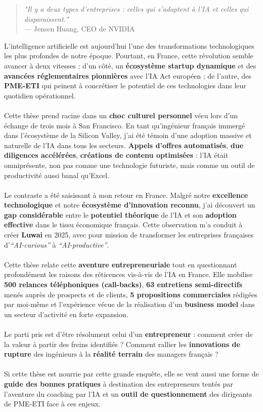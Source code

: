 \begin{quote}
\textit{"Il y a deux types d'entreprises : celles qui s'adaptent à l'IA et celles qui disparaissent."} \\
--- Jensen Huang, CEO de NVIDIA
\end{quote}
\medskip

L’intelligence artificielle est aujourd’hui l’une des transformations technologiques les plus profondes de notre époque. Pourtant, en France, cette révolution semble avancer à deux vitesses : d’un côté, un \textbf{écosystème startup dynamique} et des \textbf{avancées réglementaires pionnières} avec l’IA Act européen ; de l’autre, des \textbf{PME-ETI} qui peinent à concrétiser le potentiel de ces technologies dans leur quotidien opérationnel.
\\\\
Cette thèse prend racine dans un \textbf{choc culturel personnel} vécu lors d’un échange de trois mois à San Francisco. En tant qu’ingénieur français immergé dans l’écosystème de la Silicon Valley, j’ai été témoin d’une adoption massive et naturelle de l’IA dans tous les secteurs. \textbf{Appels d’offres automatisés}, \textbf{due diligences accélérées}, \textbf{créations de contenu optimisées} : l’IA était omniprésente, non pas comme une technologie futuriste, mais comme un outil de productivité aussi banal qu’Excel.
\\\\
Le contraste a été saisissant à mon retour en France. Malgré notre \textbf{excellence technologique} et notre \textbf{écosystème d’innovation reconnu}, j’ai découvert un \textbf{gap considérable} entre le \textbf{potentiel théorique} de l’IA et son \textbf{adoption effective} dans le tissu économique français. Cette observation m’a conduit à créer \textbf{Luwai} en 2025, avec pour mission de transformer les entreprises françaises d’\textit{“AI-curious”} à \textit{“AI-productive”}.
\\\\
Cette thèse relate cette \textbf{aventure entrepreneuriale} tout en questionnant profondément les raisons des réticences vis-à-vis de l’IA en France. Elle mobilise \textbf{500 relances téléphoniques (call-backs)}, \textbf{63 entretiens semi-directifs} menés auprès de prospects et de clients, \textbf{5 propositions commerciales} rédigées par moi-même et l’expérience vécue de la réalisation d’un \textbf{business model} dans un secteur d’activité en forte expansion.
\\\\
Le parti pris est d’être résolument celui d’un \textbf{entrepreneur} : comment créer de la valeur à partir des freins identifiés ? Comment rallier les \textbf{innovations de rupture} des ingénieurs à la \textbf{réalité terrain} des managers français ?
\\\\
Si cette thèse est nourrie par cette grande enquête, elle se veut aussi une forme de \textbf{guide des bonnes pratiques} à destination des entrepreneurs tentés par l’aventure du coaching par l’IA et un \textbf{outil de questionnement} des dirigeants de PME-ETI face à ces enjeux.